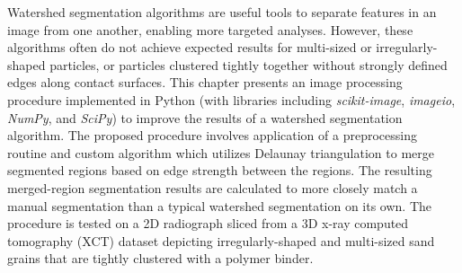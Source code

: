 Watershed segmentation algorithms are useful tools
to separate features in an image from one another, enabling
more targeted analyses. However, these algorithms
often do not achieve expected results for multi-sized or
irregularly-shaped particles, or particles clustered tightly together without
strongly defined edges along contact surfaces.
This chapter presents an image processing procedure
implemented in Python (with
libraries including \textit{scikit-image}, \textit{imageio}, \textit{NumPy},
and \textit{SciPy}) to improve the results of a
watershed segmentation algorithm. The proposed procedure involves application
of a preprocessing routine and custom algorithm which utilizes Delaunay
triangulation to merge segmented regions based on
edge strength between the regions.
The resulting merged-region segmentation results are calculated to more
closely match a manual segmentation than a typical watershed segmentation
on its own. The procedure is tested on a 2D radiograph sliced from a 3D
x-ray computed tomography (XCT) dataset depicting irregularly-shaped and
multi-sized sand grains that are tightly clustered with a polymer binder.

